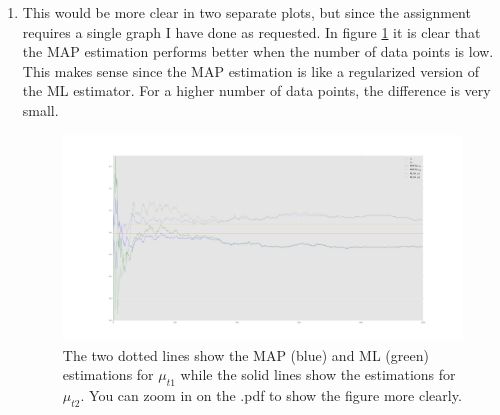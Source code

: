 \documentclass[paper=a4, fontsize=10pt]{scrartcl} %
\numberwithin{equation}{section} %
\numberwithin{figure}{section} %
\numberwithin{table}{section} %
\begin{document}
\begin{enumerate}
			\begin{align}
				\boldsymbol\mu = \begin{pmatrix} 0.67161114 \\ 0.91312478 \end{pmatrix}
			\end{align}

			The code snippet:

			\begin{verbatim}
					for i in range(1, np.size(pairs, 0)+1):
					    S = np.linalg.inv(np.linalg.inv(sigma[i-1]) + np.linalg.inv(sigma_t))
					    mu[i] = np.dot(S, (np.dot(np.linalg.inv(sigma_t), pairs[i-1]) +
					            np.dot(np.linalg.inv(sigma[i-1]), mu[i-1])))
					    sigma[i] = S

					    print mu[i]
			\end{verbatim}

			Note that \verb|np.dot| is equivalent to Matlab's *-operator.
	\item This would be more clear in two separate plots, but since the assignment requires a single graph I have done as requested.
		  In figure \ref{map} it is clear that the MAP estimation performs better when the number of data points is low. This makes sense since the MAP estimation is like a regularized version of the ML estimator. For a higher number of data points, the difference is very small.

			\begin{figure}[ht!]
				\centering
				\hspace*{-10em}\includegraphics[width=1.3\textwidth]{exercise_134.png}
				\caption{The two dotted lines show the MAP (blue) and ML (green) estimations for $\mu_{t1}$ while the solid lines show the estimations for $\mu_{t2}$. You can zoom in on the .pdf to show the figure more clearly.}
				\label{map}
			\end{figure}
\end{enumerate}
\end{document}
